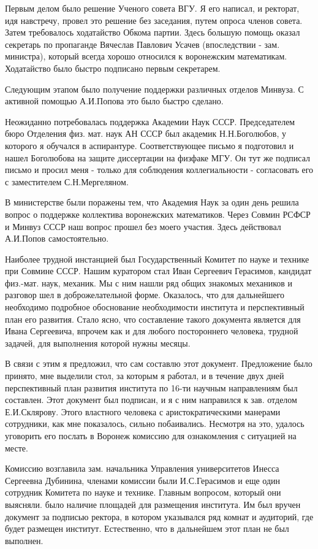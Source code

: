 Первым делом было решение Ученого совета ВГУ. Я его написал, и ректорат, идя навстречу, провел это решение без заседания, путем опроса членов совета. Затем требовалось ходатайство Обкома партии. Здесь большую помощь оказал секретарь по пропаганде Вячеслав Павлович Усачев (впоследствии - зам. министра), который всегда хорошо относился к воронежским математикам. Ходатайство было быстро подписано первым секретарем.

Следующим этапом было получение поддержки различных отделов Минвуза. С активной помощью А.И.Попова это было быстро сделано.

Неожиданно потребовалась поддержка Академии Наук СССР. Председателем бюро Отделения физ. мат. наук АН СССР был академик Н.Н.Боголюбов, у которого я обучался в аспирантуре. Соответствующее письмо я подготовил и нашел Боголюбова на защите диссертации на физфаке МГУ. Он тут же подписал письмо и просил меня - только для соблюдения коллегиальности - согласовать его с заместителем С.Н.Мергеляном.

В министерстве были поражены тем, что Академия Наук за один день решила вопрос о поддержке коллектива воронежских математиков. Через Совмин РСФСР и Минвуз СССР наш вопрос прошел без моего участия. Здесь действовал А.И.Попов самостоятельно.

Наиболее трудной инстанцией был Государственный Комитет по науке и технике при Совмине СССР.
Нашим куратором стал Иван Сергеевич Герасимов, кандидат физ.-мат. наук, механик. Мы с ним нашли ряд общих знакомых механиков и разговор шел в доброжелательной форме. Оказалось, что для дальнейшего необходимо подробное обоснование необходимости института и перспективный план его развития. Стало ясно, что составление такого документа является для Ивана Сергеевича, впрочем как и для любого постороннего человека, трудной задачей, для выполнения которой нужны месяцы.

В связи с этим я предложил, что сам составлю этот документ. Предложение было принято, мне выделили стол, за которым я работал, и в течение двух
дней перспективный план развития института по 16-ти научным направлениям был составлен. Этот документ был подписан, и я с ним направился к зав. отделом Е.И.Склярову. Этого властного человека с аристократическими манерами сотрудники, как мне показалось, сильно побаивались. Несмотря на это, удалось уговорить его послать в Воронеж комиссию для ознакомления с ситуацией на месте.

Комиссию возглавила зам. начальника Управления университетов Инесса Сергеевна Дубинина, членами комиссии были И.С.Герасимов и еще один сотрудник Комитета по науке и технике. Главным вопросом, который они выясняли. было наличие площадей для размещения института. Им был вручен документ за подписью ректора, в котором указывался ряд комнат и аудиторий, где будет размещен институт. Естественно, что в дальнейшем этот план не был выполнен.

